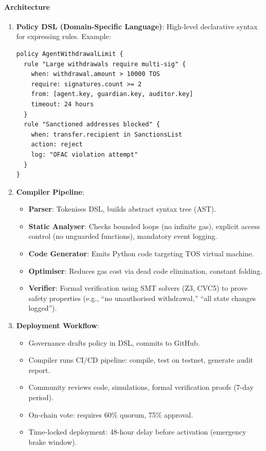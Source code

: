 \documentclass[11pt]{article}
\begin{document}
\paragraph{Architecture}
\begin{enumerate}[noitemsep]
  \item \textbf{Policy DSL (Domain-Specific Language)}: High-level declarative syntax for expressing rules. Example:
  \begin{verbatim}
policy AgentWithdrawalLimit {
  rule "Large withdrawals require multi-sig" {
    when: withdrawal.amount > 10000 TOS
    require: signatures.count >= 2
    from: [agent.key, guardian.key, auditor.key]
    timeout: 24 hours
  }
  rule "Sanctioned addresses blocked" {
    when: transfer.recipient in SanctionsList
    action: reject
    log: "OFAC violation attempt"
  }
}
  \end{verbatim}
  \item \textbf{Compiler Pipeline}:
    \begin{itemize}[noitemsep]
      \item \textbf{Parser}: Tokenises DSL, builds abstract syntax tree (AST).
      \item \textbf{Static Analyser}: Checks bounded loops (no infinite gas), explicit access control (no unguarded functions), mandatory event logging.
      \item \textbf{Code Generator}: Emits Python code targeting TOS virtual machine.
      \item \textbf{Optimiser}: Reduces gas cost via dead code elimination, constant folding.
      \item \textbf{Verifier}: Formal verification using SMT solvers (Z3, CVC5) to prove safety properties (e.g., ``no unauthorised withdrawal,'' ``all state changes logged'').
    \end{itemize}
  \item \textbf{Deployment Workflow}:
    \begin{itemize}[noitemsep]
      \item Governance drafts policy in DSL, commits to GitHub.
      \item Compiler runs CI/CD pipeline: compile, test on testnet, generate audit report.
      \item Community reviews code, simulations, formal verification proofs (7-day period).
      \item On-chain vote: requires 60\% quorum, 75\% approval.
      \item Time-locked deployment: 48-hour delay before activation (emergency brake window).
    \end{itemize}
\end{enumerate}
\end{document}
